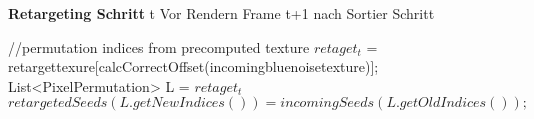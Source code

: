 \cite{hal02158423}

\begin{algorithm}[H]
    \caption{\textbf{Retargeting Schritt} t Vor Rendern Frame t+1 nach Sortier Schritt}
    \begin{algorithmic}[1]
        \STATE //permutation indices from precomputed texture
        \STATE $retaget_{t}$ = retargettexure[calcCorrectOffset(incomingbluenoisetexture)];
        \STATE List<PixelPermutation> L = $retaget_{t}$
        \STATE $retargetedSeeds(L.getNewIndices()) = incomingSeeds(L.getOldIndices());$
        \ENDFOR
    \end{algorithmic}
    \label{alg:retargeting}
\end{algorithm}
